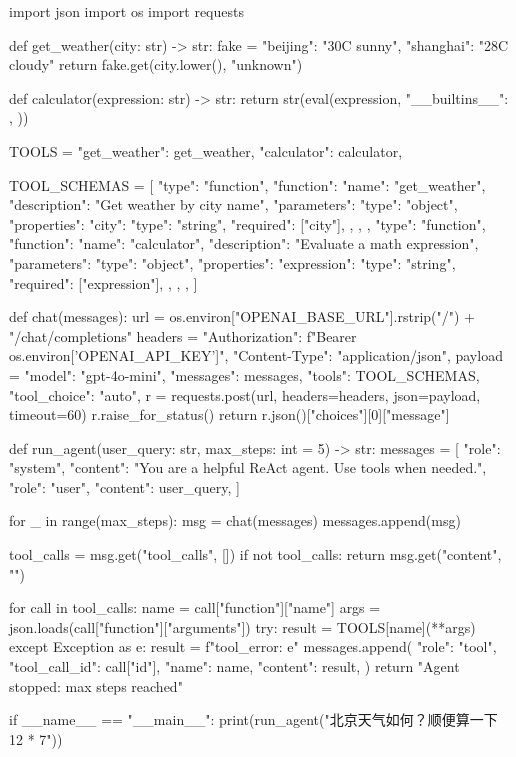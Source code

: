 \begin{codeblock}
import json
import os
import requests


def get_weather(city: str) -> str:
    fake = {"beijing": "30C sunny", "shanghai": "28C cloudy"}
    return fake.get(city.lower(), "unknown")


def calculator(expression: str) -> str:
    return str(eval(expression, {"__builtins__": {}}, {}))


TOOLS = {
    "get_weather": get_weather,
    "calculator": calculator,
}

TOOL_SCHEMAS = [
    {
        "type": "function",
        "function": {
            "name": "get_weather",
            "description": "Get weather by city name",
            "parameters": {
                "type": "object",
                "properties": {"city": {"type": "string"}},
                "required": ["city"],
            },
        },
    },
    {
        "type": "function",
        "function": {
            "name": "calculator",
            "description": "Evaluate a math expression",
            "parameters": {
                "type": "object",
                "properties": {"expression": {"type": "string"}},
                "required": ["expression"],
            },
        },
    },
]


def chat(messages):
    url = os.environ["OPENAI_BASE_URL"].rstrip("/") + "/chat/completions"
    headers = {
        "Authorization": f"Bearer {os.environ['OPENAI_API_KEY']}",
        "Content-Type": "application/json",
    }
    payload = {
        "model": "gpt-4o-mini",
        "messages": messages,
        "tools": TOOL_SCHEMAS,
        "tool_choice": "auto",
    }
    r = requests.post(url, headers=headers, json=payload, timeout=60)
    r.raise_for_status()
    return r.json()["choices"][0]["message"]


def run_agent(user_query: str, max_steps: int = 5) -> str:
    messages = [
        {"role": "system", "content": "You are a helpful ReAct agent. Use tools when needed."},
        {"role": "user", "content": user_query},
    ]

    for _ in range(max_steps):
        msg = chat(messages)
        messages.append(msg)

        tool_calls = msg.get("tool_calls", [])
        if not tool_calls:
            return msg.get("content", "")

        for call in tool_calls:
            name = call["function"]["name"]
            args = json.loads(call["function"]["arguments"])
            try:
                result = TOOLS[name](**args)
            except Exception as e:
                result = f"tool_error: {e}"
            messages.append(
                {
                    "role": "tool",
                    "tool_call_id": call["id"],
                    "name": name,
                    "content": result,
                }
            )
    return "Agent stopped: max steps reached"


if __name__ == "__main__":
    print(run_agent("北京天气如何？顺便算一下 12 * 7"))
\end{codeblock}


